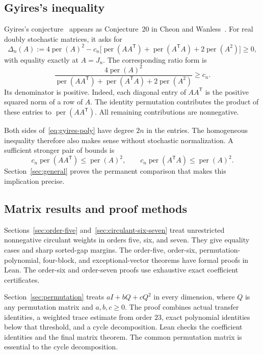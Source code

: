 \documentclass[11pt,a4paper]{article}
\theoremstyle{definition}
\theoremstyle{remark}
\newcommand{\per}{\operatorname{per}}
\newcommand{\T}{\mathsf{T}}
\begin{document}
\subsection{Gyires's inequality}

Gyires's conjecture~\cite{gyires} appears as Conjecture~20 in Cheon and Wanless~\cite{cw}.
For real doubly stochastic matrices, it asks for
\begin{equation}\label{eq:gyires-poly}
\Delta_n(A):=4\per(A)^2-c_n\bigl[\per(AA^\T)+\per(A^\T A)+2\per(A^2)\bigr]\ge0,
\end{equation}
with equality exactly at $A=J_n$.
The corresponding ratio form is
\[
\frac{4\per(A)^2}{\per(AA^\T)+\per(A^\T A)+2\per(A^2)}\ge c_n.
\]
Its denominator is positive.
Indeed, each diagonal entry of $AA^\T$ is the positive squared norm of a row of $A$.
The identity permutation contributes the product of these entries to $\per(AA^\T)$.
All remaining contributions are nonnegative.

Both sides of~\eqref{eq:gyires-poly} have degree $2n$ in the entries.
The homogeneous inequality therefore also makes sense without stochastic normalization.
A sufficient stronger pair of bounds is
\begin{equation}\label{eq:strong-pair}
c_n\per(AA^\T)\le\per(A)^2,
\qquad c_n\per(A^\T A)\le\per(A)^2.
\end{equation}
Section~\ref{sec:general} proves the permanent comparison that makes this implication precise.

\subsection{Matrix results and proof methods}

Sections~\ref{sec:order-five} and~\ref{sec:circulant-six-seven} treat unrestricted nonnegative circulant weights in orders five, six, and seven.
They give equality cases and sharp sorted-gap margins.
The order-five, order-six, permutation-polynomial, four-block, and exceptional-vector theorems have formal proofs in Lean.
The order-six and order-seven proofs use exhaustive exact coefficient certificates.

Section~\ref{sec:permutation} treats $aI+bQ+cQ^2$ in every dimension, where $Q$ is any permutation matrix and $a,b,c\ge0$.
The proof combines actual transfer identities, a weighted trace estimate from order $23$, exact polynomial identities below that threshold, and a cycle decomposition.
Lean checks the coefficient identities and the final matrix theorem.
The common permutation matrix is essential to the cycle decomposition.
\end{document}
